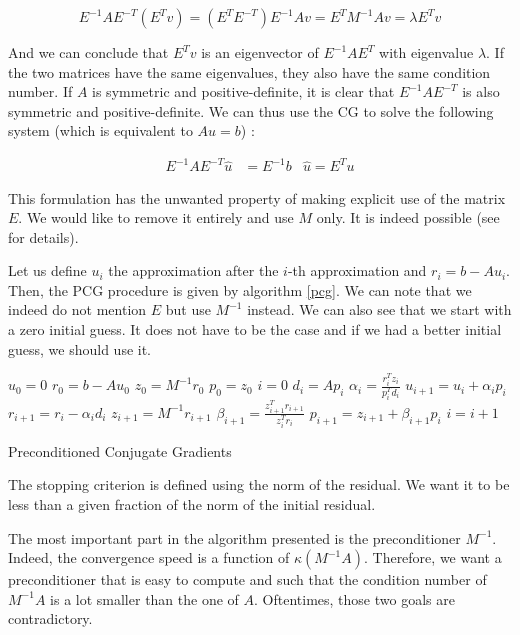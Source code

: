 $$E^{-1}AE^{-T} (E^{T}v) = (E^{T}E^{-T})E^{-1}Av = E^{T}M^{-1}Av = \lambda E^Tv$$

And we can conclude that $E^Tv$ is an eigenvector of $E^{-1}AE^T$ with eigenvalue $\lambda$. If the two matrices have the same eigenvalues, they also have the same condition number. If $A$ is symmetric and positive-definite, it is clear that $E^{-1}AE^{-T}$ is also symmetric and positive-definite. We can thus use the CG to solve the following system (which is equivalent to $Au=b$) : 

\begin{align*}
E^{-1}AE^{-T} \hat{u} &= E^{-1}b &\hat{u} = E^{T}u
\end{align*}

This formulation has the unwanted property of making explicit use of the matrix $E$. We would like to remove it entirely and use $M$ only. It is indeed possible (see \cite{conj_grad} for details).

Let us define $u_i$ the approximation after the $i$-th approximation and $r_i = b-Au_i$. Then, the PCG procedure is given by algorithm \ref{pcg}. We can note that we indeed do not mention $E$ but use $M^{-1}$ instead. We can also see that we start with a zero initial guess. It does not have to be the case and if we had a better initial guess, we should use it. 

\begin{algorithm}
\begin{algorithmic}
\State $u_0 = 0$
\State $r_0 = b-Au_0$
\State $z_0 = M^{-1}r_0$
\State $p_0 = z_0$
\State $i = 0$
\State $d_i = Ap_i$
\State $\alpha_i = \frac{r_i^Tz_i}{p^T_id_i}$
\State $u_{i+1} = u_i + \alpha_i p_i$
\State $r_{i+1} = r_i - \alpha_i d_i$
\State $z_{i+1} = M^{-1}r_{i+1}$
\State $\beta_{i+1} = \frac{z_{i+1}^Tr_{i+1}}{z_i^Tr_i}$
\State $ p_{i+1} = z_{i+1} + \beta_{i+1}p_i$
\State $i = i+1$
\EndWhile
\end{algorithmic}
\caption{Preconditioned Conjugate Gradients}
\label{pcg}
\end{algorithm}

The stopping criterion is defined using the norm of the residual. We want it to be less than a given fraction of the norm of the initial residual. 

The most important part in the algorithm presented is the preconditioner $M^{-1}$. Indeed, the convergence speed is a function of $\kappa(M^{-1}A)$. Therefore, we want a preconditioner that is easy to compute and such that the condition number of $M^{-1}A$ is a lot smaller than the one of $A$. Oftentimes, those two goals are contradictory. 

